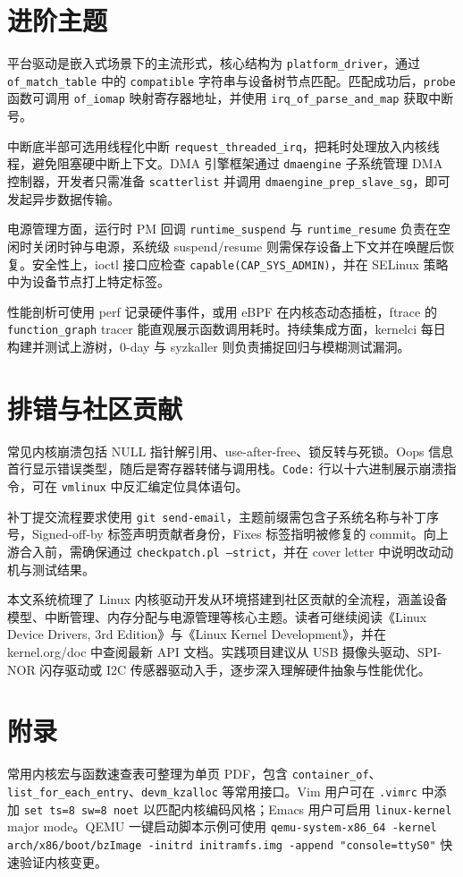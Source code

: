 \chapter{进阶主题}
平台驱动是嵌入式场景下的主流形式，核心结构为 \texttt{platform\_{}driver}，通过 \texttt{of\_{}match\_{}table} 中的 \texttt{compatible} 字符串与设备树节点匹配。匹配成功后，\texttt{probe} 函数可调用 \texttt{of\_{}iomap} 映射寄存器地址，并使用 \texttt{irq\_{}of\_{}parse\_{}and\_{}map} 获取中断号。\par
中断底半部可选用线程化中断 \texttt{request\_{}threaded\_{}irq}，把耗时处理放入内核线程，避免阻塞硬中断上下文。DMA 引擎框架通过 \texttt{dmaengine} 子系统管理 DMA 控制器，开发者只需准备 \texttt{scatterlist} 并调用 \texttt{dmaengine\_{}prep\_{}slave\_{}sg}，即可发起异步数据传输。\par
电源管理方面，运行时 PM 回调 \texttt{runtime\_{}suspend} 与 \texttt{runtime\_{}resume} 负责在空闲时关闭时钟与电源，系统级 suspend/resume 则需保存设备上下文并在唤醒后恢复。安全性上，ioctl 接口应检查 \texttt{capable(CAP\_{}SYS\_{}ADMIN)}，并在 SELinux 策略中为设备节点打上特定标签。\par
性能剖析可使用 perf 记录硬件事件，或用 eBPF 在内核态动态插桩，ftrace 的 \texttt{function\_{}graph} tracer 能直观展示函数调用耗时。持续集成方面，kernelci 每日构建并测试上游树，0-day 与 syzkaller 则负责捕捉回归与模糊测试漏洞。\par
\chapter{排错与社区贡献}
常见内核崩溃包括 NULL 指针解引用、use-after-free、锁反转与死锁。Oops 信息首行显示错误类型，随后是寄存器转储与调用栈。\texttt{Code:} 行以十六进制展示崩溃指令，可在 \texttt{vmlinux} 中反汇编定位具体语句。\par
补丁提交流程要求使用 \texttt{git send-email}，主题前缀需包含子系统名称与补丁序号，Signed-off-by 标签声明贡献者身份，Fixes 标签指明被修复的 commit。向上游合入前，需确保通过 \texttt{checkpatch.pl --strict}，并在 cover letter 中说明改动动机与测试结果。\par
本文系统梳理了 Linux 内核驱动开发从环境搭建到社区贡献的全流程，涵盖设备模型、中断管理、内存分配与电源管理等核心主题。读者可继续阅读《Linux Device Drivers, 3rd Edition》与《Linux Kernel Development》，并在 kernel.org/doc 中查阅最新 API 文档。实践项目建议从 USB 摄像头驱动、SPI-NOR 闪存驱动或 I2C 传感器驱动入手，逐步深入理解硬件抽象与性能优化。\par
\chapter{附录}
常用内核宏与函数速查表可整理为单页 PDF，包含 \texttt{container\_{}of}、\texttt{list\_{}for\_{}each\_{}entry}、\texttt{devm\_{}kzalloc} 等常用接口。Vim 用户可在 \texttt{.vimrc} 中添加 \texttt{set ts=8 sw=8 noet} 以匹配内核编码风格；Emacs 用户可启用 \texttt{linux-kernel} major mode。QEMU 一键启动脚本示例可使用 \texttt{qemu-system-x86\_{}64 -kernel arch/x86/boot/bzImage -initrd initramfs.img -append "console=ttyS0"} 快速验证内核变更。\par
